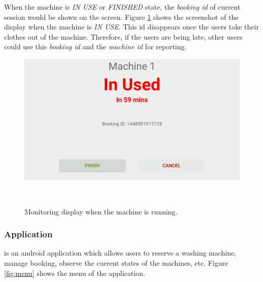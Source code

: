 When the machine is \emph{IN USE} or \emph{FINISHED} state, the \emph{booking id} of current session would be shown on the screen. Figure \ref{fig:figure3} shows the screenshot of the display when the machine is \emph{IN USE}. This id disappears once the users take their clothes out of the machine. Therefore, if the users are being late, other users could use this \emph{booking id} and the \emph{machine id} for reporting.
\begin{figure}[h]
\centering
  \includegraphics[width=0.8\columnwidth]{figures/inuse}
  \caption{Monitoring display when the machine is running.}~\label{fig:figure3}
\end{figure}
\subsubsection{{\toolname} Application}
{\toolname} is an android application which allows users to reserve a washing machine, manage booking, observe the current states of the machines, etc. Figure \ref{fig:menu} shows the menu of the application.

